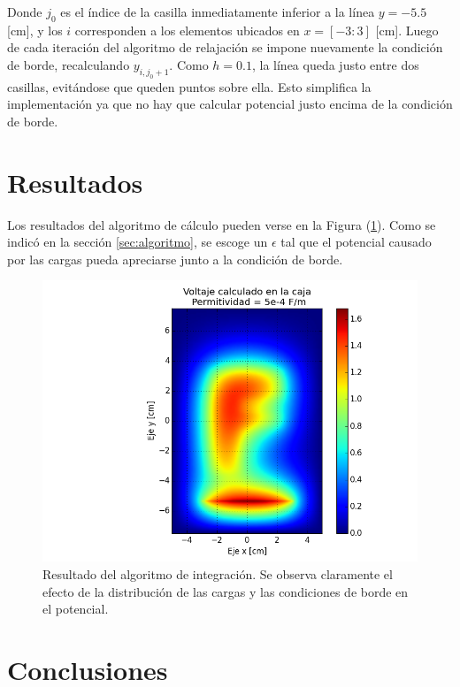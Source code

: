 \documentclass{article}
\begin{document}
Donde $j_0$ es el índice de la casilla inmediatamente inferior a la línea $y = -5.5$ [cm], y los $i$ corresponden a los elementos ubicados en $x = [-3:3]$ [cm]. Luego de cada iteración del algoritmo de relajación se impone nuevamente la condición de borde, recalculando $y_{i,j_0 + 1}$. Como $h=0.1$, la línea queda justo entre dos casillas, evitándose que queden puntos sobre ella. Esto simplifica la implementación ya que no hay que calcular potencial justo encima de la condición de borde.


\section{Resultados}

Los resultados del algoritmo de cálculo pueden verse en la Figura (\ref{fig:volt_calculado}). Como se indicó en la sección \ref{sec:algoritmo}, se escoge un $\epsilon$ tal que el potencial causado por las cargas pueda apreciarse junto a la condición de borde.

\begin{figure}
  \centering
  \includegraphics[scale = 0.7]{images/volt_calculado}
  \caption{Resultado del algoritmo de integración. Se observa claramente el efecto de la distribución de las cargas y las condiciones de borde en el potencial.}
  \label{fig:volt_calculado}
\end{figure}

\section{Conclusiones}
\end{document}
